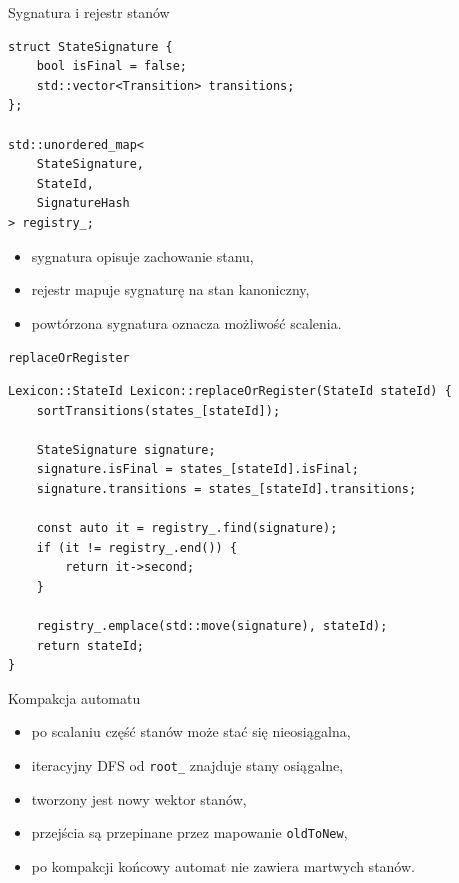 \documentclass{beamer}
\begin{document}
\begin{frame}[fragile]{Sygnatura i rejestr stanów}
    \begin{verbatim}
struct StateSignature {
    bool isFinal = false;
    std::vector<Transition> transitions;
};

std::unordered_map<
    StateSignature,
    StateId,
    SignatureHash
> registry_;
\end{verbatim}

    \begin{itemize}
        \item sygnatura opisuje zachowanie stanu,
        \item rejestr mapuje sygnaturę na stan kanoniczny,
        \item powtórzona sygnatura oznacza możliwość scalenia.
    \end{itemize}
\end{frame}

\begin{frame}[fragile]{\texttt{replaceOrRegister}}
    \begin{verbatim}
Lexicon::StateId Lexicon::replaceOrRegister(StateId stateId) {
    sortTransitions(states_[stateId]);

    StateSignature signature;
    signature.isFinal = states_[stateId].isFinal;
    signature.transitions = states_[stateId].transitions;

    const auto it = registry_.find(signature);
    if (it != registry_.end()) {
        return it->second;
    }

    registry_.emplace(std::move(signature), stateId);
    return stateId;
}
\end{verbatim}
\end{frame}

\begin{frame}{Kompakcja automatu}
    \begin{itemize}
        \item po scalaniu część stanów może stać się nieosiągalna,
        \item iteracyjny DFS od \texttt{root\_} znajduje stany osiągalne,
        \item tworzony jest nowy wektor stanów,
        \item przejścia są przepinane przez mapowanie \texttt{oldToNew},
        \item po kompakcji końcowy automat nie zawiera martwych stanów.
    \end{itemize}
\end{frame}
\end{document}
